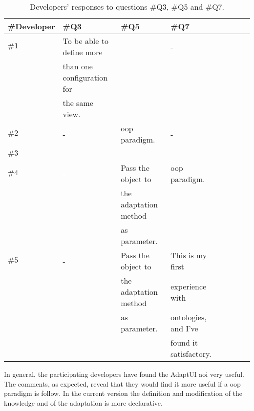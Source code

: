 \begin{table}
  \caption{Developers' responses to questions \#Q3, \#Q5 and \#Q7.}
 \label{tbl:developers_responses_2}
\footnotesize
\centering
 \begin{tabular}{l l l l l l l l}
  \hline 
  \textbf{\#Developer} 	& \textbf{\#Q3} 		& \textbf{\#Q5} 	& \textbf{\#Q7}	\\
  \hline
  $\#1$			& To be able to define more	& 			& -		\\
			& than one configuration for 	& 			& 		\\
			& the same view.		& 			& 		\\
  $\#2$			& -				& \acs{oop} paradigm.	& -		\\
  $\#3$			& -				& -			& -		\\
  $\#4$			& - 				& Pass the object to	& \acs{oop} paradigm.	\\
			&				& the adaptation method & 		\\
			&				& as parameter.		& 		\\
  $\#5$			& -				& Pass the object to	& This is my first \\
			& 				& the adaptation method	& experience with  \\
			& 				& as parameter.		& ontologies, and I've \\
			&				&			& found it satisfactory. \\
  \hline
\end{tabular}
\end{table}

In general, the participating developers have found the AdaptUI \ac{aoi} very 
useful. The comments, as expected, reveal that they would find it more useful
if a \acs{oop} paradigm is follow. In the current version the definition and
modification of the knowledge and of the adaptation is more declarative.
